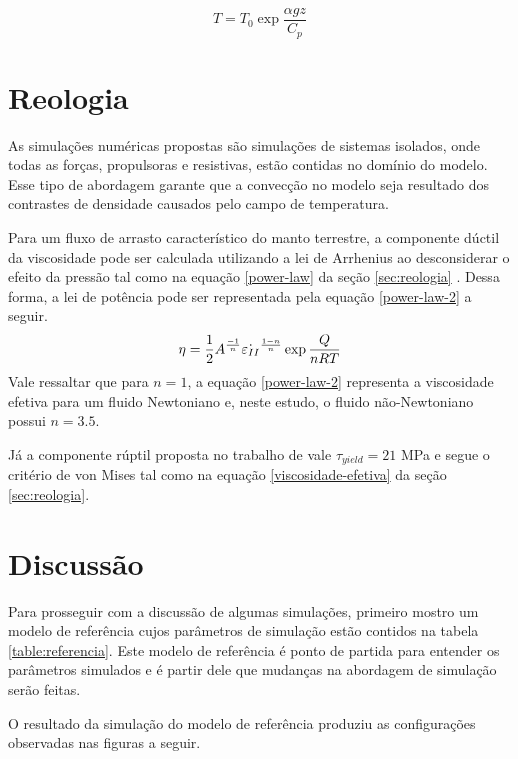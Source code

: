 \begin{equation}{}\label{eq:adiabatic-temp}
  T = T_0 \exp{\frac{\alpha g z}{C_p}}
\end{equation}


\section{Reologia}

As simulações numéricas propostas são simulações de sistemas isolados, onde todas as forças, propulsoras e resistivas, estão contidas no domínio do modelo. Esse tipo de abordagem garante que a convecção no modelo seja resultado dos contrastes de densidade causados pelo campo de temperatura.

Para um fluxo de arrasto característico do manto terrestre, a componente dúctil da viscosidade pode ser calculada utilizando a lei de Arrhenius ao desconsiderar o efeito da pressão tal como na equação \ref{power-law} da seção \ref{sec:reologia} \citep{vankeken2008community}. Dessa forma, a lei de potência pode ser representada pela equação \ref{power-law-2} a seguir.
\begin{equation}{\label{power-law-2}}
	\eta = \frac{1}{2} A^{\frac{-1}{n}} \dot{\varepsilon_{II}}^{\frac{1-n}{n}} \exp{\frac{Q}{nRT}} 
\end{equation}
Vale ressaltar que para $n=1$, a equação \ref{power-law-2} representa a viscosidade efetiva para um fluido Newtoniano e, neste estudo, o fluido não-Newtoniano possui $n=3.5$.

Já a componente rúptil proposta no trabalho de \citet{strak2021thermo} vale $\tau_{yield}=21$ MPa e segue o critério de von Mises tal como na equação \ref{viscosidade-efetiva} da seção \ref{sec:reologia}.

\section{Discussão}

Para prosseguir com a discussão de algumas simulações, primeiro mostro um modelo de referência cujos parâmetros de simulação estão contidos na tabela \ref{table:referencia}. Este modelo de referência é ponto de partida para entender os parâmetros simulados e é partir dele que mudanças na abordagem de simulação serão feitas.

 

O resultado da simulação do modelo de referência produziu as configurações observadas nas figuras a seguir.






